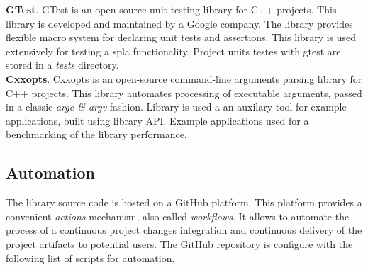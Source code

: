 \textbf{GTest}. GTest is an open source unit-testing library for C++ projects. This library is developed and maintained by a Google company. The library provides flexible macro system for declaring unit tests and assertions. This library is used extensively for testing a spla functionality. Project units testes with gtest are stored in a \textit{tests} directory.\\

\textbf{Cxxopts}. Cxxopts is an open-source command-line arguments parsing library for C++ projects. This library automates processing of executable arguments, passed in a classic \textit{argc \& argv} fashion. Library is used a an auxilary tool for example applications, built using library API. Example applications used for a benchmarking of the library performance.\\

\subsection{Automation}

The library source code is hosted on a GitHub platform. This platform provides a convenient \textit{actions} mechanism, also called \textit{workflows}. It allows to automate the process of a continuous project changes integration and continuous delivery of the project artifacts to potential users. The GitHub repository is configure with the following list of scripts for automation.

